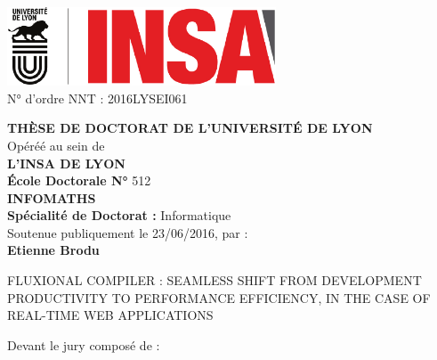\begin{center}
\includegraphics[width=8cm]{../resources/logos.pdf}%
\\[1em]


{N° d'ordre NNT : 2016LYSEI061 \hfill}

\vfill
{
  \fontsize{14pt}{16pt}\selectfont%

  {\large\textbf{\MakeUppercase{Thèse de doctorat de l'université de Lyon}}}\\[1em]

  Opéréé au sein de\\
  {\large\textbf{\MakeUppercase{L'INSA de Lyon}}}\\[1em]

  {\large\textbf{École Doctorale N° }512}\\
  {\large\textbf{\MakeUppercase{InfoMaths}}}\\[1em]

  {\large\textbf{Spécialité de Doctorat : }Informatique}\\[1em]

  Soutenue publiquement le 23/06/2016, par :\\
  {\large\textbf{Etienne Brodu}}\\[1em]
}

\vfill

\parbox{\linewidth}{%
\vspace{10pt}
\redline%
\vspace{10pt}
\secfont\fontsize{20pt}{25pt}\selectfont%
\MakeUppercase{Fluxional compiler : seamless shift from development productivity to performance efficiency, in the case of real-time web applications}%
\vspace{10pt}%
\redline%
\vspace{10pt}
}

\vfill

Devant le jury composé de : \\[1em]


\end{center}
